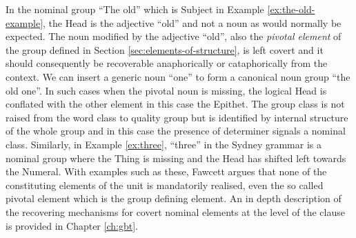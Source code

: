     In the nominal group ``The old'' which is Subject in Example \ref{ex:the-old-example}, the Head is the adjective ``old'' and not a noun as would normally be expected. The noun modified by the adjective ``old'', also the \textit{pivotal element} of the group defined in Section \ref{sec:elements-of-structure}, is left covert and it should consequently be recoverable anaphorically or cataphorically from the context. We can insert a generic noun ``one'' to form a canonical noun group ``the old one''. In such cases when the pivotal noun is missing, the logical Head is conflated with the other element in this case the Epithet. The group class is not raised from the word class to quality group but is identified by internal structure  of the whole group and in this case the presence of determiner signals a nominal class. Similarly, in Example \ref{ex:three}, ``three'' in the Sydney grammar is a nominal group where the Thing is missing and the Head has shifted left towards the Numeral. With examples such as these, Fawcett argues that none of the constituting elements of the unit is mandatorily realised, even the so called pivotal element which is the group defining element. An in depth description of the recovering mechanisms for covert nominal elements at the level of the clause is provided in Chapter \ref{ch:gbt}.
    
     
